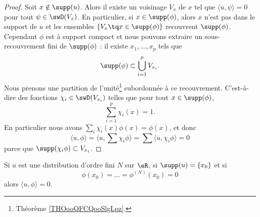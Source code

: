 \begin{proof}
	Soit \( x\notin\supp(u)\). Alors il existe un voisinage \( V_x\) de \( x\) tel que \( \langle u, \psi\rangle =0\) pour tout \( \psi\in\swD(V_x)\). En particulier, si \( x\in\supp(\phi)\), alors \( x\) n'est pas dans le support de \( u\) et les ensembles \( \{ V_x\tq x\in\supp(\phi) \}\) recouvrent \( \supp(\phi)\). Cependant \( \phi\) est à support compact et nous pouvons extraire un sous-recouvrement fini de \( \supp(\phi)\) : il existe \( x_1,\ldots, x_p\) tels que
	\begin{equation}
		\supp(\phi)\subset\bigcup_{i=1}^pV_{x_i}.
	\end{equation}
	Nous prenons une partition de l'unité\footnote{Théorème \ref{THOooQFCQooSlgLpz}.} subordonnée à ce recouvrement. C'est-à-dire des fonctions \( \chi_i\in\swD(V_{x_i})\) telles que pour tout \( x\in\supp(\phi)\),
	\begin{equation}
		\sum_{i=1}^p\chi_i(x)=1.
	\end{equation}
	En particulier nous avons \( \sum_i\chi_i(x)\phi(x)=\phi(x)\), et donc
	\begin{equation}
		\langle u, \phi\rangle =\langle u, \sum \chi_i\phi\rangle =\sum\langle u, \chi_i\phi\rangle =0
	\end{equation}
	parce que \( \supp(\chi_i\phi)\subset V_{x_i}\).
\end{proof}

\begin{lemma}
	Si \( u\) est une distribution d'ordre fini \( N\) sur \( \eR\), si \( \supp(u)=\{ x_0 \}\) et si
	\begin{equation}
		\phi(x_0)=\ldots=\phi^{(N)}(x_0)=0
	\end{equation}
	alors \( \langle u, \phi\rangle =0\).
\end{lemma}

